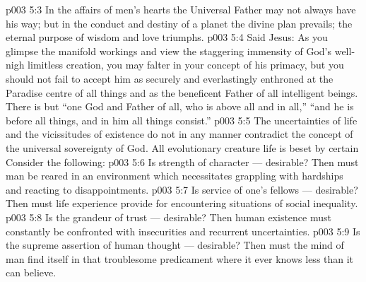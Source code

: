 \vs p003 5:3 In the affairs of men’s hearts the Universal Father may not always have his way; but in the conduct and destiny of a planet the divine plan prevails; the eternal purpose of wisdom and love triumphs.
\vs p003 5:4 Said Jesus:  As you glimpse the manifold workings and view the staggering immensity of God’s well\hyp{}nigh limitless creation, you may falter in your concept of his primacy, but you should not fail to accept him as securely and everlastingly enthroned at the Paradise centre of all things and as the beneficent Father of all intelligent beings. There is but “one God and Father of all, who is above all and in all,” “and he is before all things, and in him all things consist.”
\vs p003 5:5 \pc The uncertainties of life and the vicissitudes of existence do not in any manner contradict the concept of the universal sovereignty of God. All evolutionary creature life is beset by certain  Consider the following:
\vs p003 5:6 \bibnobreakspace Is  strength of character --- desirable? Then must man be reared in an environment which necessitates grappling with hardships and reacting to disappointments.
\vs p003 5:7 \bibnobreakspace Is  service of one’s fellows --- desirable? Then must life experience provide for encountering situations of social inequality.
\vs p003 5:8 \bibnobreakspace Is  the grandeur of trust --- desirable? Then human existence must constantly be confronted with insecurities and recurrent uncertainties.
\vs p003 5:9 \bibnobreakspace Is  the supreme assertion of human thought --- desirable? Then must the mind of man find itself in that troublesome predicament where it ever knows less than it can believe.
